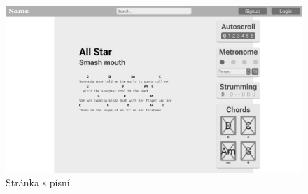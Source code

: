 \begin{figure}[h!]
    \centering
    \includegraphics[width=\textwidth]{assets/song_page.png}
    \caption{Stránka s písní}
    \label{fig:song_page}
\end{figure}